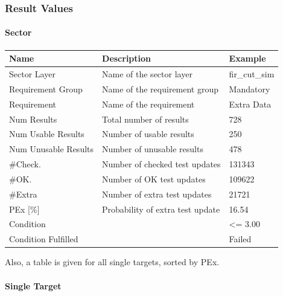 \subsubsection{Result Values}

\paragraph{Sector}

\begin{center}
 \begin{table}[H]
  \begin{tabularx}{\textwidth}{ | l | X |  l | }
    \hline
    \textbf{Name} & \textbf{Description} & \textbf{Example} \\ \hline
    Sector Layer & Name of the sector layer & fir\_cut\_sim  \\ \hline
    Requirement Group & Name of the requirement group & Mandatory  \\ \hline
    Requirement & Name of the requirement & Extra Data  \\ \hline 
    Num Results & Total number of results & 728 \\ \hline
    Num Usable Results & Number of usable results & 250 \\ \hline
    Num Unusable Results & Number of unusable results & 478 \\ \hline
    \#Check. & Number of checked test updates & 131343 \\ \hline
    \#OK. & Number of OK test updates & 109622 \\ \hline
    \#Extra & Number of extra test updates & 21721 \\ \hline
    PEx [\%] & Probability of extra test update & 16.54 \\ \hline
    Condition &  & <= 3.00 \\ \hline
    Condition Fulfilled &  & Failed \\ \hline
\end{tabularx}
\end{table}
\end{center}

Also, a table is given for all single targets, sorted by PEx.

\paragraph{Single Target}


